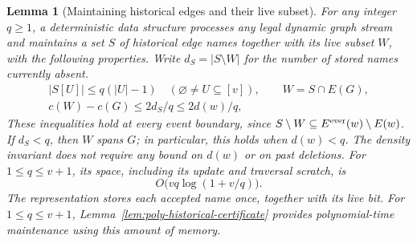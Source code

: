 \documentclass[11pt,letterpaper]{article}
\newtheorem{lemma}[theorem]{Lemma}
\numberwithin{equation}{section}
\begin{document}
\begin{lemma}[Maintaining historical edges and their live subset]
\label{lem:dense-compressed-certificate}
\label{lem:current-deficit-certificate}
For any integer $q\ge1$, a deterministic data structure processes any legal dynamic graph stream and maintains a set $S$ of historical edge names together with its live subset $W$, with the following properties.
Write $d_S=|S\setminus W|$ for the number of stored names currently absent.
\begin{equation}
\begin{gathered}
 |S[U]|\le q(|U|-1)
       \quad(\varnothing\ne U\subseteq[v]),\qquad
 W=S\cap E(G),\\
 c(W)-c(G)\le2d_S/q\le2d(w)/q,
 \end{gathered}                                                   \label{eq:forest-df6}
\end{equation}
These inequalities hold at every event boundary, since $S\setminus W\subseteq E^{\rm ever}(w)\setminus E(w)$.
If $d_S<q$, then $W$ spans $G$; in particular, this holds when $d(w)<q$.
The density invariant does not require any bound on $d(w)$ or on past deletions.
For $1\le q\le v+1$, its space, including its update and traversal scratch, is
\begin{equation}
O\bigl(vq\log(1+v/q)\bigr).                        \label{eq:forest-df7}
\end{equation}
The representation stores each accepted name once, together with its live bit.
For $1\le q\le v+1$, Lemma~\ref{lem:poly-historical-certificate} provides polynomial-time maintenance using this amount of memory.
\end{lemma}
\end{document}
